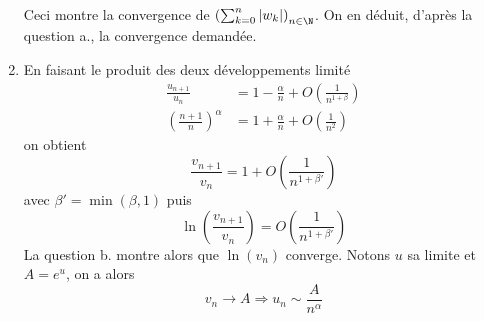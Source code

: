 \begin{enumerate}
Ceci montre la convergence de $\left( \sum_{k=0}^n|w_k|\right) _{n\in \N}$. On en déduit, d'après la question a., la convergence demandée.
 \item En faisant le produit des deux développements limité
\begin{align*}
 \frac{u_{n+1}}{u_n} &= 1 -\frac{\alpha}{n} +O(\frac{1}{n^{1+\beta}}) \\
 \left(\frac{n+1}{n} \right)^\alpha &= 1 +\frac{\alpha}{n} +O(\frac{1}{n^{2}})
\end{align*}
on obtient
\begin{displaymath}
 \frac{v_{n+1}}{v_n} = 1 + O(\frac{1}{n^{1+\beta'}})
\end{displaymath}
avec $\beta'=\min(\beta,1)$ puis
\begin{displaymath}
 \ln\left( \frac{v_{n+1}}{v_n}\right)  = O(\frac{1}{n^{1+\beta'}})
\end{displaymath}
La question b. montre alors que $\ln(v_n)$ converge. Notons $u$ sa limite et $A=e^u$, on a alors
\begin{displaymath}
 v_n \rightarrow A \Rightarrow u_n \sim \frac{A}{n^\alpha}
\end{displaymath}

\end{enumerate}
